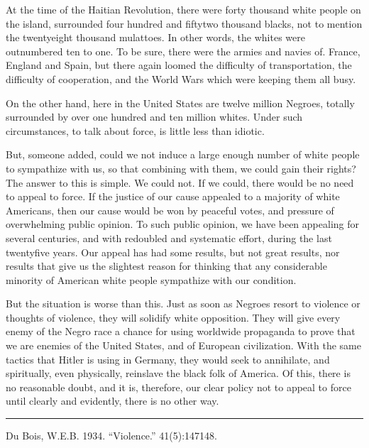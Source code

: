 \documentclass[letterpaper,10pt,english]{jupyterBook}
\begin{document}
\sphinxAtStartPar
At the time of the Haitian Revolution, there were forty thousand white people on the island, surrounded four hundred and fifty\sphinxhyphen{}two thousand blacks, not to mention the twenty\sphinxhyphen{}eight thousand mulattoes. In other words, the whites were outnumbered ten to one. To be sure, there were the armies and navies of. France, England and Spain, but there again loomed the difficulty of transportation, the difficulty of co\sphinxhyphen{}operation, and the World Wars which were keeping them all busy.

\sphinxAtStartPar
On the other hand, here in the United States are twelve million Negroes, totally surrounded by over one hundred and ten million whites. Under such circumstances, to talk about force, is little less than idiotic.

\sphinxAtStartPar
But, someone added, could we not induce a large enough number of white people to sympathize with us, so that combining with them, we could gain their rights? The answer to this is simple. We could not. If we could, there would be no need to appeal to force. If the justice of our cause appealed to a majority of white Americans, then our cause would be won by peaceful votes, and pressure of overwhelming public opinion. To such public opinion, we have been appealing for several centuries, and with redoubled and systematic effort, during the last twenty\sphinxhyphen{}five years. Our appeal has had some results, but not great results, nor results that give us the slightest reason for thinking that any considerable minority of American white people sympathize with our condition.

\sphinxAtStartPar
But the situation is worse than this. Just as soon as Negroes resort to violence or thoughts of violence, they will solidify white opposition. They will give every enemy of the Negro race a chance for using world\sphinxhyphen{}wide propaganda to prove that we are enemies of the United States, and of European civilization. With the same tactics that Hitler is using in Germany, they would seek to annihilate, and spiritually, even physically, reinslave the black folk of America. Of this, there is no reasonable doubt, and it is, therefore, our clear policy not to appeal to force until clearly and evidently, there is no other way.


\bigskip\hrule\bigskip


\sphinxAtStartPar
{} Du Bois, W.E.B. 1934. “Violence.”   41(5):147\sphinxhyphen{}148.
\end{document}
